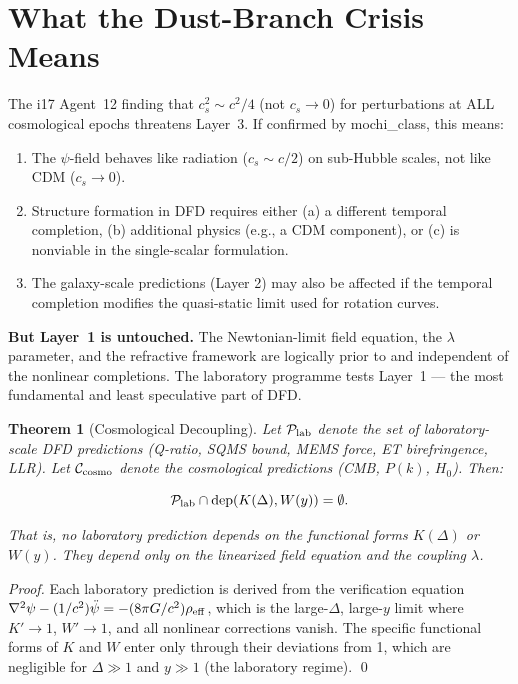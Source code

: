\documentclass[11pt]{article}
\newtheorem{theorem}{Theorem}[section]
\theoremstyle{definition}
\theoremstyle{remark}
\begin{document}
\section{What the Dust-Branch Crisis Means}

The i17 Agent~12 finding that $c_s^2 \sim c^2/4$ (not $c_s \to 0$)
for perturbations at ALL cosmological epochs threatens Layer~3.
If confirmed by mochi\_class, this means:

\begin{enumerate}[nosep]
\item The $\psi$-field behaves like radiation ($c_s \sim c/2$) on
  sub-Hubble scales, not like CDM ($c_s \to 0$).
\item Structure formation in DFD requires either (a) a different
  temporal completion, (b) additional physics (e.g., a CDM component),
  or (c) is nonviable in the single-scalar formulation.
\item The galaxy-scale predictions (Layer 2) may also be affected
  if the temporal completion modifies the quasi-static limit
  used for rotation curves.
\end{enumerate}

\textbf{But Layer~1 is untouched.} The Newtonian-limit field equation,
the $\lambda$ parameter, and the refractive framework are logically
prior to and independent of the nonlinear completions. The laboratory
programme tests Layer~1 --- the most fundamental and least speculative
part of DFD.

\begin{theorem}[Cosmological Decoupling]
\label{thm:decoupling}
Let $\mathcal{P}_{\rm lab}$ denote the set of laboratory-scale DFD
predictions (Q-ratio, SQMS bound, MEMS force, ET birefringence, LLR).
Let $\mathcal{C}_{\rm cosmo}$ denote the cosmological predictions
(CMB, $P(k)$, $H_0$). Then:

\begin{equation}
\mathcal{P}_{\rm lab} \cap \text{dep}(K(\Delta), W(y)) = \emptyset.
\end{equation}

That is, no laboratory prediction depends on the functional forms
$K(\Delta)$ or $W(y)$. They depend only on the linearized field equation
and the coupling $\lambda$.
\end{theorem}

\begin{proof}
Each laboratory prediction is derived from the verification equation
$\nabla^2\psi - (1/c^2)\ddot\psi = -(8\pi G/c^2)\rho_{\rm eff}$,
which is the large-$\Delta$, large-$y$ limit where $K' \to 1$,
$W' \to 1$, and all nonlinear corrections vanish. The specific
functional forms of $K$ and $W$ enter only through their deviations
from 1, which are negligible for $\Delta \gg 1$ and $y \gg 1$
(the laboratory regime). \qed
\end{proof}
\end{document}
